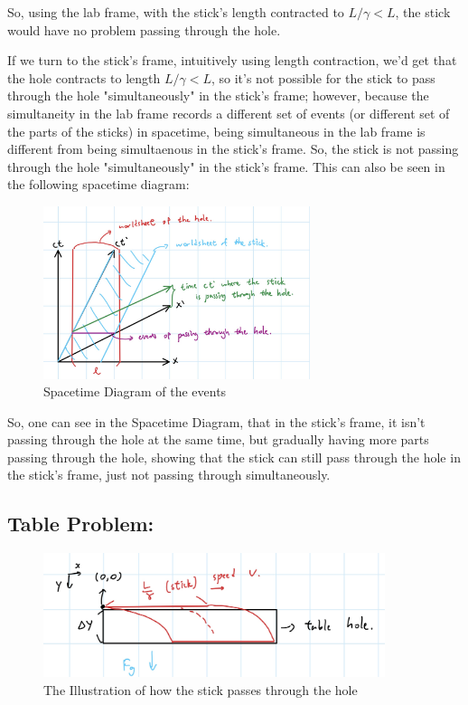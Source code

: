 \documentclass{article}
\begin{document}
So, using the lab frame, with the stick's length contracted to $L/\gamma<L$, the stick would have no problem passing through the hole.

\hfil

If we turn to the stick's frame, intuitively using length contraction, we'd get that the hole contracts to length $L/\gamma<L$, so it's not possible for the stick to pass through the hole "simultaneously" in the stick's frame; however, because the simultaneity in the lab frame records a different set of events (or different set of the parts of the sticks) in spacetime, being simultaneous in the lab frame is different from being simultaenous in the stick's frame. So, the stick is not passing through the hole "simultaneously" in the stick's frame. This can also be seen in the following spacetime diagram:

\begin{figure}[h!]
    \begin{center}
        \includegraphics[width=78mm]{hw4 q41.jpg}
        \caption{Spacetime Diagram of the events}
    \end{center}
\end{figure}

So, one can see in the Spacetime Diagram, that in the stick's frame, it isn't passing through the hole at the same time, but gradually having more parts passing through the hole, showing that the stick can still pass through the hole in the stick's frame, just not passing through simultaneously.

\subsection*{Table Problem:}

\begin{figure}[h!]
    \begin{center}
        \includegraphics[width=100mm]{hw4 q42.jpg}
        \caption{The Illustration of how the stick passes through the hole}
    \end{center}
\end{figure}
\end{document}
